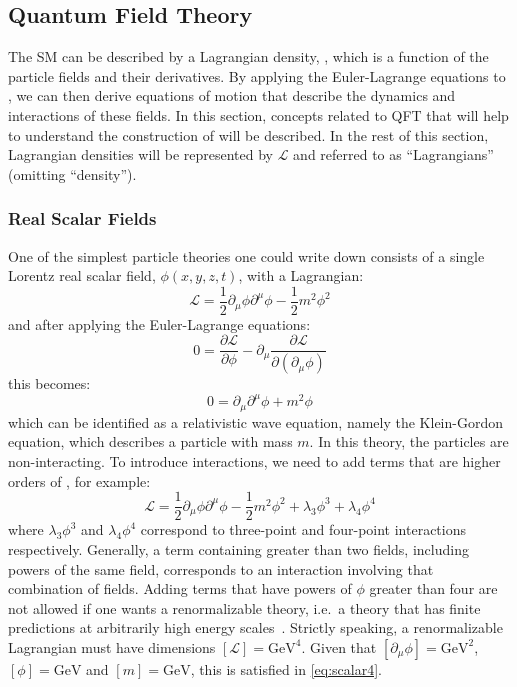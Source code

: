 \subsection{Quantum Field Theory}\label{sec:electroweak}
The SM can be described by a Lagrangian density, \LSM, which is a function of the particle fields and their derivatives. By applying the Euler-Lagrange equations to \LSM, we can then derive equations of motion that describe the dynamics and interactions of these fields. In this section, concepts related to QFT that will help to understand the construction of \LSM will be described. In the rest of this section, Lagrangian densities will be represented by $\mathcal{L}$ and referred to as ``Lagrangians'' (omitting ``density'').

\subsubsection{Real Scalar Fields}
One of the simplest particle theories one could write down consists of a single Lorentz real scalar field, $\phi(x,y,z,t)$, with a Lagrangian:
\begin{equation}
  \mathcal{L} = \frac{1}{2}\partial_\mu \phi \partial^\mu \phi - \frac{1}{2}m^2\phi^2
\end{equation}
and after applying the Euler-Lagrange equations:
\begin{equation}
  0 = \frac{\partial \mathcal{L}}{\partial \phi} - \partial_\mu \frac{\partial \mathcal{L}}{\partial(\partial_\mu \phi)}
\end{equation}
this becomes:
\begin{equation}
  0 = \partial_\mu \partial^\mu \phi + m^2 \phi \label{eq:klein_gordon}
\end{equation}
which can be identified as a relativistic wave equation, namely the Klein-Gordon equation, which describes a particle with mass $m$. In this theory, the particles are non-interacting. To introduce interactions, we need to add terms that are higher orders of \phi, for example:
\begin{equation}
  \mathcal{L} = \frac{1}{2}\partial_\mu \phi \partial^\mu \phi - \frac{1}{2}m^2\phi^2 + \lambda_3 \phi^3 + \lambda_4 \phi^4
  \label{eq:scalar4}
\end{equation}
where $\lambda_3 \phi^3$ and $\lambda_4 \phi^4$ correspond to three-point and four-point interactions respectively. Generally, a term containing greater than two fields, including powers of the same field, corresponds to an interaction involving that combination of fields. Adding terms that have powers of $\phi$ greater than four are not allowed if one wants a renormalizable theory, i.e.\ a theory that has finite predictions at arbitrarily high energy scales~\cite{Peskin:1995ev}. Strictly speaking, a renormalizable Lagrangian must have dimensions $[\mathcal{L}] = \mathrm{GeV}^4$. Given that $[\partial_\mu \phi] = \mathrm{GeV}^2$, $[\phi] = \mathrm{GeV}$ and $[m] = \mathrm{GeV}$, this is satisfied in \cref{eq:scalar4}. 


